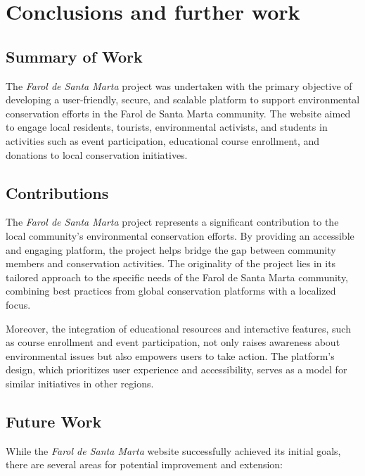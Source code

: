 \chapter{Conclusions and further work}
\label{ch:conclusions}

\section{Summary of Work}

The \textit{Farol de Santa Marta} project was undertaken with the primary objective of developing a user-friendly, secure, and scalable platform to support environmental conservation efforts in the Farol de Santa Marta community. The website aimed to engage local residents, tourists, environmental activists, and students in activities such as event participation, educational course enrollment, and donations to local conservation initiatives.

\section{Contributions}

The \textit{Farol de Santa Marta} project represents a significant contribution to the local community’s environmental conservation efforts. By providing an accessible and engaging platform, the project helps bridge the gap between community members and conservation activities. The originality of the project lies in its tailored approach to the specific needs of the Farol de Santa Marta community, combining best practices from global conservation platforms with a localized focus.

Moreover, the integration of educational resources and interactive features, such as course enrollment and event participation, not only raises awareness about environmental issues but also empowers users to take action. The platform’s design, which prioritizes user experience and accessibility, serves as a model for similar initiatives in other regions.

\section{Future Work}

While the \textit{Farol de Santa Marta} website successfully achieved its initial goals, there are several areas for potential improvement and extension:

